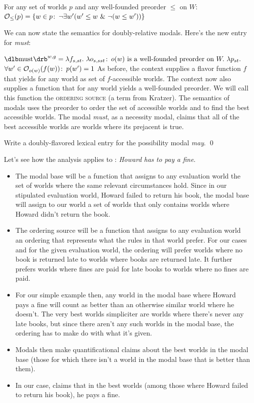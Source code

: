 \ex For any set of worlds $p$ and any well-founded preorder $\le$ on $W$:\\
\hfill
$\opt_{\le}(p) = \{w\in p\co \neg\exists w'(w'\le w\ \&\ \neg(w\le w'))\}$
\xe

We can now state the semantics for doubly-relative modals. Here's the new entry
for \emph{must}:

\ex $\svt{must}^{w,g} = \lambda f_{s,st}.\ \lambda o_{s,sst}\co o(w)\text{ is a
  well-founded preorder on }W.\ \lambda p_{st}.$\\
  \hfill $\forall w'\in \opt_{o(w)}(f(w))\co p(w') = 1$
\xe
%
As before, the context supplies a flavor function $f$ that yields for any world
as set of $f$-accessible worlds. The context now also supplies a function that
for any world yields a well-founded preorder. We will call this function the
\textsc{ordering source} (a term from Kratzer). The semantics of modals uses the
preorder to order the set of accessible worlds and to find the best accessible
worlds. The modal \emph{must}, as a necessity modal, claims that all of the best
accessible worlds are worlds where its prejacent is true.

\begin{exercise}
  Write a doubly-flavored lexical entry for the possibility modal \emph{may}.
  \qed
\end{exercise}

Let's see how the analysis applies to : \emph{Howard has to pay a
  fine}.

\begin{itemize}
\item The modal base will be a function that assigns to any evaluation world the
  set of worlds where the same relevant circumstances hold. Since in our
  stipulated evaluation world, Howard failed to return his book, the modal base
  will assign to our world a set of worlds that only contains worlds where
  Howard didn't return the book.
\item The ordering source will be a function that assigns to any evaluation
  world an ordering that represents what the rules in that world prefer. For our
  cases and for the given evaluation world, the ordering will prefer worlds
  where no book is returned late to worlds where books are returned late. It
  further prefers worlds where fines are paid for late books to worlds where no
  fines are paid.
\item For our simple example then, any world in the modal base where Howard pays
  a fine will count as better than an otherwise similar world where he doesn't.
  The very best worlds simpliciter are worlds where there's never any
  late books, but since there aren't any such worlds in the modal base, the
  ordering has to make do with what it's given.
\item Modals then make quantificational claims about the best worlds in the
  modal base (those for which there isn't a world in the modal base that is
  better than them).
\item In our case,  claims that in the best worlds (among
  those where Howard failed to return his book), he pays a fine.
\end{itemize}

